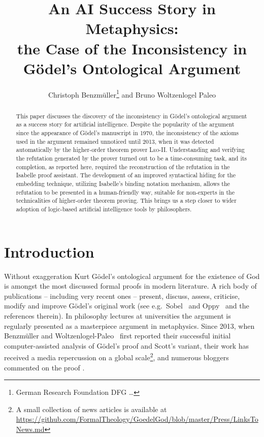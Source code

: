 \documentclass{article}
\title{An AI Success Story in Metaphysics: \\ the Case of the Inconsistency in G\"odel's Ontological Argument}
\author{Christoph Benzm\"uller\thanks{German Research Foundation DFG \ldots} and Bruno Woltzenlogel Paleo}
\author{}
\begin{document}
\maketitle

\begin{abstract}
  This paper discusses the discovery of the inconsistency in G\"odel's ontological argument as a success story for artificial intelligence. Despite the popularity of the argument since the appearance of G\"odel's manuscript in 1970, the inconsistency of the axioms used in the argument remained unnoticed until 2013, when it was detected automatically by the higher-order theorem prover \textsc{Leo-II}. Understanding and verifying the refutation generated by the prover turned out to be a time-consuming task, and its completion, as reported here, required the reconstruction of the refutation in the Isabelle proof assistant. The development of an improved syntactical hiding for the embedding technique, utilizing Isabelle's binding notation mechanism, allows the refutation to be presented in a human-friendly way, suitable for non-experts in the technicalities of higher-order theorem proving. This brings us a step closer to wider adoption of logic-based artificial intelligence tools by philosophers.
\end{abstract}


\section{Introduction}\label{sec:introduction}
Without exaggeration Kurt G\"{o}del's ontological
argument for the existence of God \cite{GoedelNotes,ScottNotes} is
amongst the most discussed formal proofs in modern literature. A rich
body of publications -- including very recent ones -- present,
discuss, assess, criticise, modify and improve G\"{o}del's original
work (see e.g.~Sobel~ and Oppy~ and the
references therein).  In philosophy lectures at universities the
argument is regularly presented as a masterpiece argument in
metaphysics. Since 2013, when Benzm\"uller and Woltzenlogel-Paleo~ first
reported their successful initial computer-assisted
analysis of G\"odel's proof and Scott's variant,
their work has received a media repercussion on a global scale\footnote{A
  small collection of news articles is available at {\scriptsize
    \url{https://github.com/FormalTheology/GoedelGod/blob/master/Press/LinksToNews.md}}},
and numerous bloggers commented on the proof
\cite{fuhrmann15:_blogg_goedel}.
\end{document}
